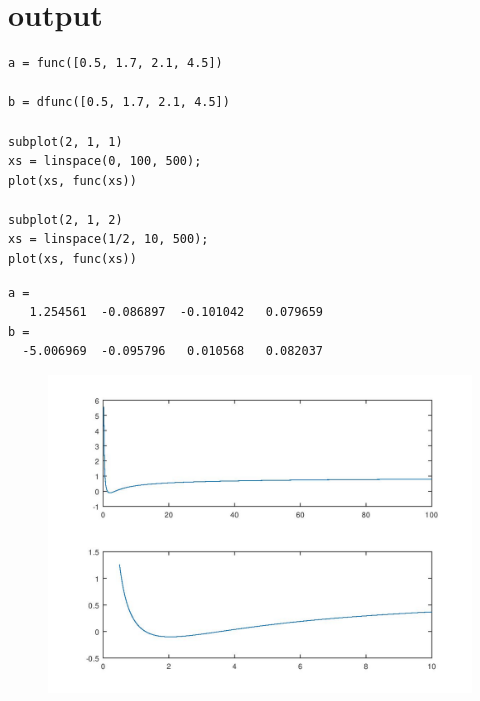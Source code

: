 \documentclass[10pt]{article}
\begin{document}
{\Huge\section*{output}}

\tableofcontents
\vspace*{4em}

\begin{lstlisting}
a = func([0.5, 1.7, 2.1, 4.5])

b = dfunc([0.5, 1.7, 2.1, 4.5])

subplot(2, 1, 1)
xs = linspace(0, 100, 500);
plot(xs, func(xs))

subplot(2, 1, 2)
xs = linspace(1/2, 10, 500);
plot(xs, func(xs))
\end{lstlisting}
\begin{lstlisting}[language={},xleftmargin=5pt,frame=none]
a =
   1.254561  -0.086897  -0.101042   0.079659
b =
  -5.006969  -0.095796   0.010568   0.082037

\end{lstlisting}
\begin{figure}[!ht]
\includegraphics[width=\textwidth]{output-1.jpg}
\end{figure}
\end{document}
